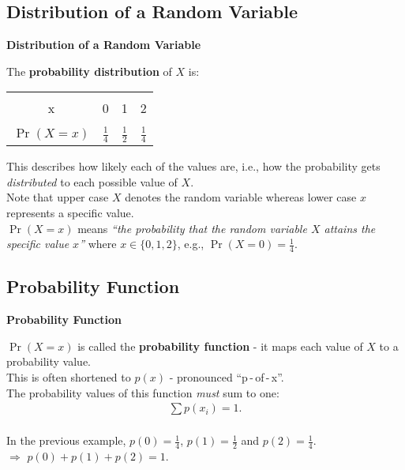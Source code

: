 \documentclass[compress]{beamer}        %
\makeatletter
\newcommand{\tcb}{\textcolor{beamer@blendedblue}}
\makeatother
\begin{document}
\subsection{Distribution of a Random Variable}
\begin{frame}{\bf \tcb{Distribution of a Random Variable}}

The {\bf probability distribution} of $X$ is:

\begin{center}
\begin{tabular}{|c|ccc|}
\hline
&&&\\[-0.4cm]
x & 0 & 1 & 2 \\
\hline
&&&\\[-0.4cm]
$\Pr(X=x)$ & $\frac{1}{4}$ & $\frac{1}{2}$ & $\frac{1}{4}$\\[0.1cm]
\hline
\end{tabular}
\end{center}

This describes how likely each of the values are, i.e., how the probability gets \emph{distributed} to each possible value of $X$.\\[0.7cm]

Note that upper case $X$ denotes the random variable whereas lower case $x$ represents a specific value.\\[0.2cm]
$\Pr(X=x)$ means \emph{``the probability that the random variable $X$ attains the specific value $x$''} where $x \in \{0, 1, 2\}$, e.g., $\Pr(X=0) = \frac{1}{4}.$
\end{frame}



\subsection{Probability Function}
\begin{frame}{\bf \tcb{Probability Function}}

$\Pr(X = x)$ is called the {\bf probability function} - it maps each value of $X$ to a probability value.\\[0.4cm]
This is often shortened to $\boxed{p(x)}$ - pronounced ``p\,-\,of\,-\,x''.\\[0.4cm]

The probability values of this function \emph{must} sum to one:
\begin{align*}
\boxed{\sum p(x_i) = 1}.\\
\end{align*}

In the previous example, $p(0) = \frac{1}{4}$, $p(1) = \frac{1}{2}$ and $p(2) = \frac{1}{4}$.\\[0.1cm]
$\Rightarrow$ $p(0) + p(1) + p(2) = 1$.

\end{frame}
\end{document}
